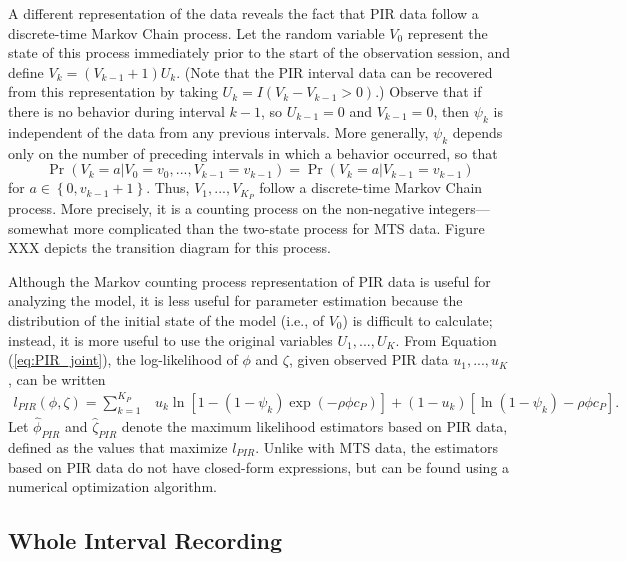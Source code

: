 \documentclass[man, noextraspace, floatsintext]{apa6}\usepackage[]{graphicx}\usepackage[]{color}
\begin{document}
A different representation of the data reveals the fact that PIR data follow a discrete-time Markov Chain process. 
Let the random variable $V_0$ represent the state of this process immediately prior to the start of the observation session, and define $V_k = \left(V_{k-1} + 1\right) U_k$. 
(Note that the PIR interval data can be recovered from this representation by taking $U_k = I(V_k - V_{k-1} > 0)$.) 
Observe that if there is no behavior during interval $k-1$, so $U_{k-1} = 0$ and $V_{k-1} = 0$, then $\psi_k$ is independent of the data from any previous intervals. 
More generally, $\psi_k$ depends only on the number of preceding intervals in which a behavior occurred, so that \[
\Pr\left(V_k = a | V_0 = v_0,...,V_{k-1} = v_{k-1}\right) = \Pr\left(V_k = a | V_{k-1} = v_{k-1}\right) \]
for $a \in \left\{ 0, v_{k-1} + 1 \right\}$. 
Thus, $V_1,...,V_{K_P}$ follow a discrete-time Markov Chain process. 
More precisely, it is a counting process on the non-negative integers---somewhat more complicated than the two-state process for MTS data. 
Figure XXX depicts the transition diagram for this process.

Although the Markov counting process representation of PIR data is useful for analyzing the model, it is less useful for parameter estimation because the distribution of the initial state of the model (i.e., of $V_0$) is difficult to calculate; instead, it is more useful to use the original variables $U_1,...,U_K$. From Equation (\ref{eq:PIR_joint}), the log-likelihood of $\phi$ and $\zeta$, given observed PIR data $u_1,...,u_K$, can be written
\begin{align}
\label{eq:PIR_loglik}
l_{PIR}\left(\phi,\zeta\right) = \sum_{k=1}^{K_P} & u_k \ln\left[1 - (1 - \psi_k)\exp\left(- \rho \phi c_P\right)\right]  + (1 - u_k)\left[\ln\left(1 - \psi_k \right) - \rho \phi c_P\right].
\end{align}
Let $\hat\phi_{PIR}$ and $\hat\zeta_{PIR}$ denote the maximum likelihood estimators based on PIR data, defined as the values that maximize $l_{PIR}$. Unlike with MTS data, the estimators based on PIR data do not have closed-form expressions, but can be found using a numerical optimization algorithm. 


\subsection{Whole Interval Recording}
\label{sec:WIR}
\end{document}
